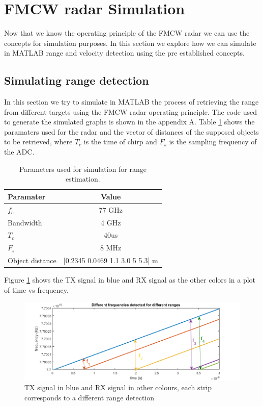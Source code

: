 \section{FMCW radar Simulation}
Now that we know the operating principle of the \ac{FMCW} \ac{radar} we can use the concepts for simulation purposes. In this section we explore how we can simulate in MATLAB range and velocity detection using the pre established concepts. 
\subsection{Simulating range detection}
In this section we try to simulate in MATLAB the process of retrieving the range from different targets using the \ac{FMCW} \ac{radar} operating principle. The code used to generate the simulated graphs is shown in the appendix A. Table \ref{tab:table1} shows the paramaters used for the radar and the vector of distances of the supposed objects to be retrieved, where $T_c$ is the time of chirp and $F_s$ is the sampling frequency of the \ac{ADC}.
\begin{table}[ht!]
  \begin{center}
    \caption{Parameters used for simulation for range estimation.}
    \label{tab:table1}
    \begin{tabular}{l|c} %
      \textbf{Paramater} & \textbf{Value } \\
      \hline
      $f_c$ & 77 GHz \\
      Bandwidth & 4 GHz \\
      $T_c$ & 40us \\
      $F_s$ & 8 MHz \\
      Object distance & [0.2345 0.0469 1.1 3.0 5 5.3]  m
    \end{tabular}
  \end{center}
\end{table}
 Figure \ref{fig:if2} shows the TX signal in blue and RX signal as the other colors in a plot of time vs frequency.
 \begin{figure}[h] 
\centerline{\includegraphics [width=1.0 \textwidth]{imgs/chapter2/SimFrequencies.png}}
\caption[Demonstration of the TX signal in blue and RX signal in other colours]{TX signal in blue and RX signal in other colours, each strip corresponds to a different range detection}
\label{fig:if2}
\end{figure}
